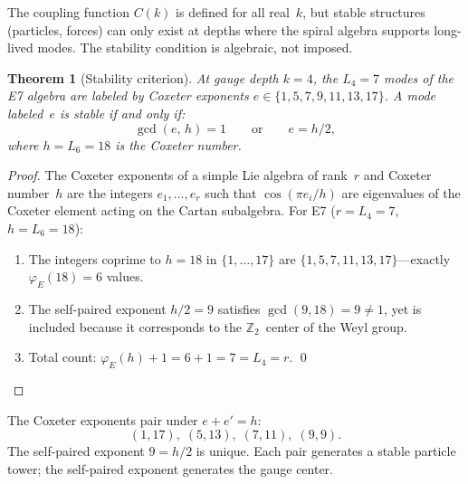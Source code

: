 \documentclass[12pt,a4paper]{article}
\newtheorem{theorem}{Theorem}[section]
\begin{document}
The coupling function $C(k)$ is defined for all real~$k$, but stable structures (particles, forces) can only exist at depths where the spiral algebra supports long-lived modes. The stability condition is algebraic, not imposed.

\begin{theorem}[Stability criterion]
At gauge depth $k = 4$, the $L_4 = 7$ modes of the E7 algebra are labeled by Coxeter exponents $e \in \{1, 5, 7, 9, 11, 13, 17\}$. A mode labeled~$e$ is stable if and only if:
\begin{equation}
\gcd(e,\, h) = 1 \qquad \text{or} \qquad e = h/2,
\end{equation}
where $h = L_6 = 18$ is the Coxeter number.
\end{theorem}

\begin{proof}
The Coxeter exponents of a simple Lie algebra of rank~$r$ and Coxeter number~$h$ are the integers $e_1, \ldots, e_r$ such that $\cos(\pi e_i/h)$ are eigenvalues of the Coxeter element acting on the Cartan subalgebra. For E7 ($r = L_4 = 7$, $h = L_6 = 18$):
\begin{enumerate}
\item The integers coprime to $h = 18$ in $\{1, \ldots, 17\}$ are $\{1, 5, 7, 11, 13, 17\}$---exactly $\varphi_E(18) = 6$ values.
\item The self-paired exponent $h/2 = 9$ satisfies $\gcd(9, 18) = 9 \neq 1$, yet is included because it corresponds to the $\mathbb{Z}_2$~center of the Weyl group.
\item Total count: $\varphi_E(h) + 1 = 6 + 1 = 7 = L_4 = r$. \qed
\end{enumerate}
\end{proof}

\noindent The Coxeter exponents pair under $e + e' = h$:
\begin{equation}
(1, 17),\; (5, 13),\; (7, 11),\; (9, 9).
\end{equation}
The self-paired exponent $9 = h/2$ is unique. Each pair generates a stable particle tower; the self-paired exponent generates the gauge center.
\end{document}
